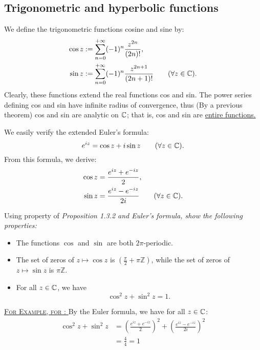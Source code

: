 \subsection{Trigonometric and hyperbolic functions}
\begin{definition}
  We define the trigonometric functions cosine and sine by:
  \begin{align*}
    \cos z &:= \sum_{n=0}^{+\infty} (-1) ^n \frac{z^{2n}}{(2n) !},   \\
    \sin z &:= 
    \sum_{n=0}^{+\infty} (-1) ^n \frac{z^{2n+1}}{(2n+1) !} \quad \quad (\forall  z \in   \mathbb{C} ).
  \end{align*}
  Clearly, these functions extend the real functions cos and sin. The power series defining cos and sin have infinite
  radius of convergence, thus (By a previous theorem) cos and sin are analytic on $\mathbb{C}  $; that is, cos and sin are 
  \underline{
  entire functions.
  }
\end{definition}
\begin{remark}
  We easily verify the extended Euler's formula: 
  \[
  e^{iz} = \cos z + i \sin z \quad \quad ( \forall  z \in   \mathbb{C} ) .    
  \]
  From this formula, we derive: 
  \begin{align*}
    \cos z &= \frac{e^{iz} + e^{-iz}}{2}, \\
    \sin z &= \frac{e^{iz} - e^{-iz}}{2i} \quad \quad (\forall  z \in   \mathbb{C} ).
  \end{align*}
\end{remark}
\exercise
Using property  of \it Proposition 1.3.2 \normalfont and Euler's formula, show the following 
properties:
\begin{itemize}
  \item[\ding{172}] The functions $\cos    $ and $\sin    $ are both $2\pi  $-periodic.
 \item[\ding{173}] The set of zeros of $z \mapsto \cos z   $ is $(\frac{\pi }{2} + \pi  \mathbb{Z})  $, while
   the set of zeros of $ z \mapsto \sin z   $ is $\pi  \mathbb{Z}$. 
 \item[\ding{174}] For all $z \in  \mathbb{C}  $, we have
   \[
   \cos ^2 z + \sin ^2  z = 1  .
   \]
\end{itemize}
\underline{ \textsc{For Example, for : }}By the Euler formula, we have for all $z \in  \mathbb{C}  $: 
\begin{align*}
  \cos ^2  z + \sin ^2  z &= 
  \left( \frac{e^{iz} + e^{-iz}}{2} \right) ^2  + 
  \left( \frac{e^{iz} - e^{-iz}}{2i} \right) ^2  \\
                          &= \frac{4}{4} = 1 
\end{align*}

